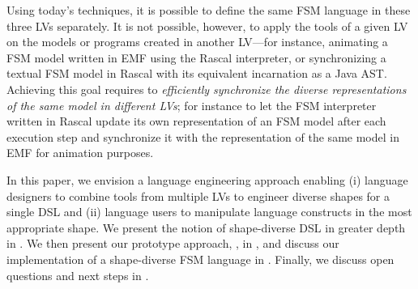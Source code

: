 Using today's techniques, it is possible to define the same FSM language in these three LVs separately.
It is not possible, however, to apply the tools of a given LV on the models or programs created in another LV---for instance, animating a FSM model written in EMF using the Rascal interpreter, or synchronizing a textual FSM model in Rascal with its equivalent incarnation as a Java AST.
Achieving this goal requires to \emph{efficiently synchronize the diverse representations of the same model in different LVs}; for instance to let the FSM interpreter written in Rascal update its own representation of an FSM model after each execution step and synchronize it with the representation of the same model in EMF for animation purposes.

In this paper, we envision a language engineering approach enabling (i) language designers to combine tools from multiple LVs to engineer diverse shapes for a single DSL and (ii) language users to manipulate language constructs in the most appropriate shape.
We present the notion of shape-diverse DSL in greater depth in .
We then present our prototype approach, \prism, in , and discuss our implementation of a shape-diverse FSM language in .
Finally, we discuss open questions and next steps in .
